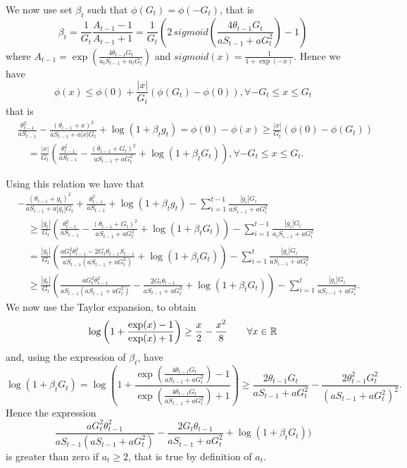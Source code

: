 We now use set $\beta_t$ such that $\phi(G_t)=\phi(-G_t)$, that is
\[
\beta_t = \frac{1}{G_t} \frac{A_{t-1}-1}{A_{t-1}+1} 
= \frac{1}{G_t} \left(2 \, sigmoid\left(\frac{4 \theta_{t-1} G_t}{a S_{t-1} + a G_t^2}\right)-1\right)
\]
where $A_{t-1}=\exp\left(\frac{4 \theta_{t-1} G_t}{a_{t} S_{t-1} + a_t G_t}\right)$ and
$sigmoid (x) =\frac{1}{1+\exp(-x)}$.
Hence we have
\[
\phi(x) \leq \phi(0)+\frac{|x|}{G_t} (\phi(G_t)-\phi(0)), \forall -G_t \leq x\leq G_t
\]
that is
\begin{align}
&\frac{\theta_{t-1}^2}{a S_{t-1}}-\frac{(\theta_{t-1}+x)^2}{a S_{t-1} + a |x| G_t} + \log(1+\beta_t g_t) = \phi(0) - \phi(x) 
\geq \frac{|x|}{G_t} (\phi(0) - \phi(G_t)) \\
&\quad = \frac{|x|}{G_t} (\frac{\theta_{t-1}^2}{a S_{t-1}} - \frac{(\theta_{t-1}+G_t)^2}{a S_{t-1} + a G_t^2} + \log(1+\beta_t G_t)), \forall -G_t \leq x\leq G_t.
\end{align}

Using this relation we have that
\begin{align}
&-\frac{(\theta_{t-1}+g_t)^2}{a S_{t-1}+a |g_t| G_t} + \frac{\theta_{t-1}^2}{a S_{t-1}}+\log(1+\beta_t g_t)-\sum_{i=1}^{t-1} \frac{|g_i| G_i}{a S_{i-1} + a G^2_i} \\
&\quad \geq \frac{|g_t|}{G_t} (\frac{\theta_{t-1}^2}{a S_{t-1}} - \frac{(\theta_{t-1}+G_t)^2}{a S_{t-1} + a G^2_t} + \log(1+\beta_t G_t)) - \sum_{i=1}^{t-1} \frac{|g_i| G_i}{a_i S_{i-1} + a G^2_i}\\
&\quad = \frac{|g_t|}{G_t} (\frac{a G^2_t \theta_{t-1}^2 -2 G_t \theta_{t-1} S_{t-1} }{a S_{t-1}(a S_{t-1} + a G^2_t)} + \log(1+\beta_t G_t)) - \sum_{i=1}^{t} \frac{|g_i|G_i}{a S_{i-1} + a G^2_i}\\
&\quad \geq \frac{|g_t|}{G_t} (\frac{a G^2_t \theta_{t-1}^2}{a S_{t-1}(a S_{t-1} + a G^2_t)}-\frac{2 G_t \theta_{t-1}}{a S_{t-1} + a G^2_t} + \log(1+\beta_t G_t)) - \sum_{i=1}^{t} \frac{|g_i| G_i}{a S_{i-1} + a G^2_i}.
\end{align}
We now use the Taylor expansion, to obtain
\[
\log\left(1+\frac{\exp(x)-1}{\exp(x)+1}\right) \geq \frac{x}{2} -\frac{x^2}{8} \qquad \forall x \in \mathbb{R}
\]
and, using the expression of $\beta_t$, have
\[
\log\left(1+\beta_t G_t\right) 
= \log\left(1+\frac{\exp\left(\frac{4 \theta_{t-1} G_t}{a S_{t-1} + a G^2_t}\right)-1}{\exp\left(\frac{4 \theta_{t-1} G_t}{a S_{t-1} + a G^2_t}\right)+1}\right) 
\geq \frac{2 \theta_{t-1} G_t}{a S_{t-1} + a G^2_t} -\frac{2 \theta_{t-1}^2 G_t^2}{(a S_{t-1} + a G^2_t)^2}.
\]
Hence the expression 
\[
\frac{a G^2_t \theta_{t-1}^2}{a S_{t-1}(a S_{t-1} + a G_t^2)}-\frac{2 G_t \theta_{t-1}}{a S_{t-1} + a G^2_t} + \log(1+\beta_t G_t))
\]
is greater than zero if $a_t \geq 2$, that is true by definition of $a_t$.

